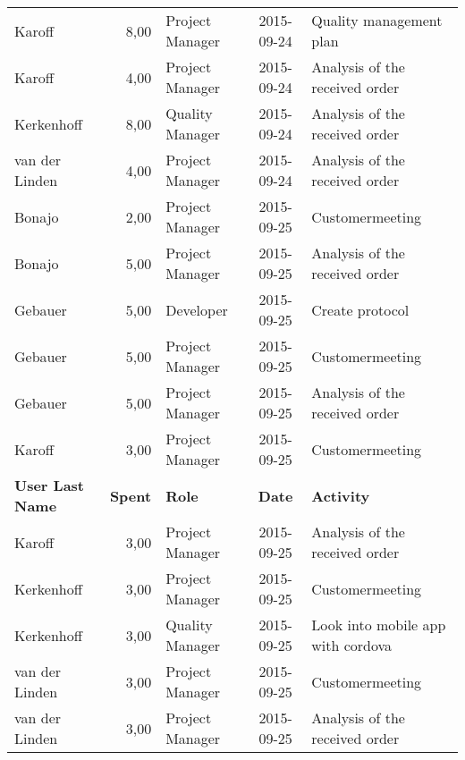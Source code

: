 \begin{longtable}{ l r p{2cm} c p{4cm}}
		Karoff                  & 8,00           & Project Manager & 2015-09-24    & Quality management plan                         \\
		Karoff                  & 4,00           & Project Manager & 2015-09-24    & Analysis of the received order                  \\
		Kerkenhoff              & 8,00           & Quality Manager & 2015-09-24    & Analysis of the received order                  \\
		van der Linden          & 4,00           & Project Manager & 2015-09-24    & Analysis of the received order                  \\
		Bonajo                  & 2,00           & Project Manager & 2015-09-25    & Customermeeting                                 \\
		Bonajo                  & 5,00           & Project Manager & 2015-09-25    & Analysis of the received order                  \\
		Gebauer                 & 5,00           & Developer       & 2015-09-25    & Create protocol                                 \\
		Gebauer                 & 5,00           & Project Manager & 2015-09-25    & Customermeeting                                 \\
		Gebauer                 & 5,00           & Project Manager & 2015-09-25    & Analysis of the received order                  \\
		Karoff                  & 3,00           & Project Manager & 2015-09-25    & Customermeeting                                 \\
		\textbf{User Last Name} & \textbf{Spent} & \textbf{Role} & \textbf{Date} & \textbf{Activity} \\
		\hline
		Karoff                  & 3,00           & Project Manager & 2015-09-25    & Analysis of the received order                  \\
		Kerkenhoff              & 3,00           & Project Manager & 2015-09-25    & Customermeeting                                 \\
		Kerkenhoff              & 3,00           & Quality Manager & 2015-09-25    & Look into mobile app with cordova               \\
		van der Linden          & 3,00           & Project Manager & 2015-09-25    & Customermeeting                                 \\
		van der Linden          & 3,00           & Project Manager & 2015-09-25    & Analysis of the received order                  \\

\end{longtable}
